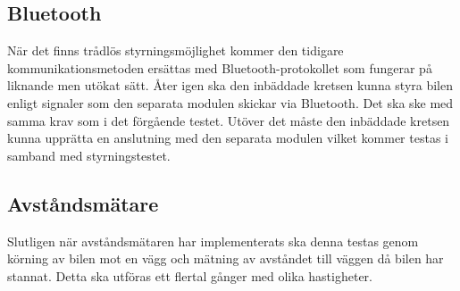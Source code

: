 \documentclass[a4paper]{article}
\begin{document}

\subsection{Bluetooth}
När det finns trådlös styrningsmöjlighet kommer den tidigare kommunikationsmetoden ersättas med Bluetooth-protokollet som fungerar på liknande men utökat sätt. Åter igen ska den inbäddade kretsen kunna styra bilen enligt signaler som den separata modulen skickar via Bluetooth. Det ska ske med samma krav som i det förgående testet. Utöver det måste den inbäddade kretsen kunna upprätta en anslutning med den separata modulen vilket kommer testas i samband med styrningstestet.



\subsection{Avståndsmätare}
Slutligen när avståndsmätaren har implementerats ska denna testas genom körning av bilen mot en vägg och mätning av avståndet till väggen då bilen har stannat. Detta ska utföras ett flertal gånger med olika hastigheter. 
\end{document}
